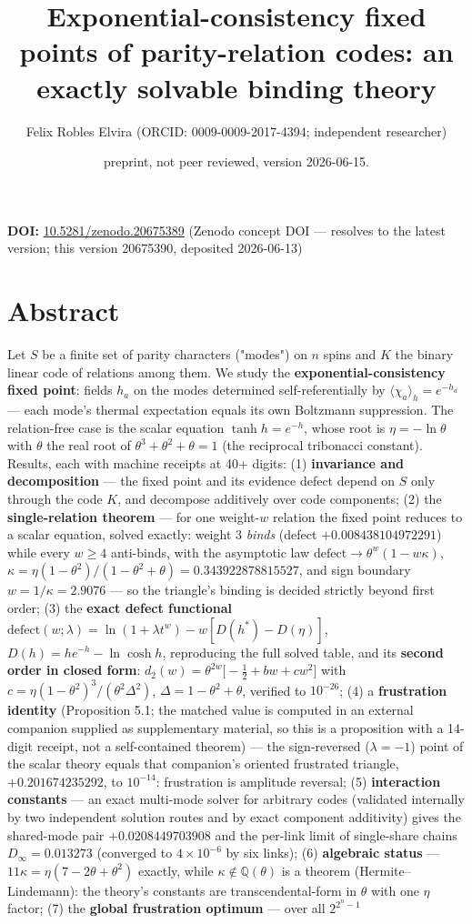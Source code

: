 \documentclass[11pt]{article}
\title{Exponential-consistency fixed points of parity-relation codes: an exactly solvable binding theory}
\author{Felix Robles Elvira (ORCID: 0009-0009-2017-4394; independent researcher)}
\date{\small preprint, not peer reviewed, version 2026-06-15.}
\begin{document}
\maketitle

\textbf{DOI:} \href{https://doi.org/10.5281/zenodo.20675389}{10.5281/zenodo.20675389} (Zenodo concept DOI — resolves to the latest version; this version 20675390, deposited 2026-06-13)

\section*{Abstract}
Let $S$ be a finite set of parity characters ("modes") on $n$ spins and $K$ the binary linear code of relations among them.  We study the \textbf{exponential-consistency fixed point}: fields $h_a$ on the modes determined self-referentially by $\langle\chi_a\rangle_h = e^{-h_a}$ — each mode's thermal expectation equals its own Boltzmann suppression.  The relation-free case is the scalar equation $\tanh h = e^{-h}$, whose root is $\eta = -\ln\theta$ with $\theta$ the real root of $\theta^3 + \theta^2 + \theta = 1$ (the reciprocal tribonacci constant).  Results, each with machine receipts at 40+ digits: (1) \textbf{invariance and decomposition} — the fixed point and its evidence defect depend on $S$ only through the code $K$, and decompose additively over code components; (2) the \textbf{single-relation theorem} — for one weight-$w$ relation the fixed point reduces to a scalar equation, solved exactly: weight 3 \emph{binds} (defect $+0.008438104972291$) while every $w \ge 4$ anti-binds, with the asymptotic law $\mathrm{defect} \to \theta^w(1 - w\kappa)$, $\kappa = \eta(1-\theta^2)/(1-\theta^2+\theta) = 0.343922878815527$, and sign boundary $w = 1/\kappa = 2.9076$ — so the triangle's binding is decided strictly beyond first order; (3) the \textbf{exact defect functional} $\mathrm{defect}(w;\lambda) = \ln(1+\lambda t^w) - w[D(h^*) - D(\eta)]$, $D(h) = he^{-h} - \ln\cosh h$, reproducing the full solved table, and its \textbf{second order in closed form}: $d_2(w) = \theta^{2w}\bigl[-\tfrac12 + bw + cw^2\bigr]$ with $c = \eta(1-\theta^2)^3/(\theta^2\Delta^2)$, $\Delta = 1-\theta^2+\theta$, verified to $10^{-26}$; (4) a \textbf{frustration identity} (Proposition 5.1; the matched value is computed in an external companion supplied as supplementary material, so this is a proposition with a 14-digit receipt, not a self-contained theorem) — the sign-reversed ($\lambda = -1$) point of the scalar theory equals that companion's oriented frustrated triangle, $+0.201674235292$, to $10^{-14}$: frustration is amplitude reversal; (5) \textbf{interaction constants} — an exact multi-mode solver for arbitrary codes (validated internally by two independent solution routes and by exact component additivity) gives the shared-mode pair $+0.0208449703908$ and the per-link limit of single-share chains $D_\infty = 0.013273$ (converged to $4\times 10^{-6}$ by six links); (6) \textbf{algebraic status} — $11\kappa = \eta(7 - 2\theta + \theta^2)$ exactly, while $\kappa \notin \mathbb Q(\theta)$ is a theorem (Hermite–Lindemann): the theory's constants are transcendental-form in $\theta$ with one $\eta$ factor; (7) the \textbf{global frustration optimum} — over all $2^{2^n-1}$ 
\end{document}
